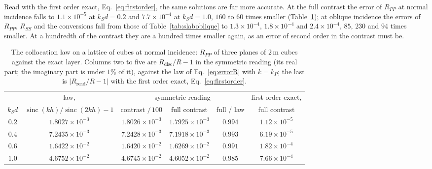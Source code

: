 \documentclass[11pt,a4paper]{article}
\newcommand{\sinc}{\operatorname{sinc}}
\begin{document}
Read with the first order exact, Eq.~\eqref{eq:firstorder}, the same solutions are far more accurate. At
the full contrast the error of $R_{PP}$ at normal incidence falls to $1.1\times10^{-5}$ at $k_Sd=0.2$ and
$7.7\times10^{-4}$ at $k_Sd=1.0$, $160$ to $60$ times smaller (Table~\ref{tab:slablaw}); at oblique
incidence the errors of $R_{PP}$, $R_{SS}$ and the conversions fall from those of
Table~\ref{tab:slaboblique} to $1.3\times10^{-4}$, $1.8\times10^{-4}$ and $2.4\times10^{-4}$, $85$, $230$
and $94$ times smaller. At a hundredth of the contrast they are a hundred times smaller again, as an error
of second order in the contrast must be.

\begin{table}[htbp]
\centering
\caption{The collocation law on a lattice of cubes at normal incidence: $R_{PP}$ of three planes of
$2$\,m cubes against the exact layer. Columns two to five are $R_{\text{disc}}/R-1$ in the symmetric
reading (its real part; the imaginary part is under $1\%$ of it), against the law of
Eq.~\eqref{eq:errorR} with $k=k_P$; the last is $\lvert R_{\text{read}}/R-1\rvert$ with the first order
exact, Eq.~\eqref{eq:firstorder}.}\label{tab:slablaw}
\small\setlength{\tabcolsep}{4pt}
\begin{tabular}{@{}cccccc@{}}
\toprule
 & law, & \multicolumn{3}{c}{symmetric reading} & first order exact, \\
$k_Sd$ & $\sinc(kh)/\sinc(2kh)-1$ & contrast $/\,100$ & full contrast & full / law & full contrast \\
\midrule
$0.2$ & $1.8027\times10^{-3}$ & $1.8026\times10^{-3}$ & $1.7925\times10^{-3}$ & $0.994$ & $1.12\times10^{-5}$ \\
$0.4$ & $7.2435\times10^{-3}$ & $7.2428\times10^{-3}$ & $7.1918\times10^{-3}$ & $0.993$ & $6.19\times10^{-5}$ \\
$0.6$ & $1.6422\times10^{-2}$ & $1.6420\times10^{-2}$ & $1.6269\times10^{-2}$ & $0.991$ & $1.82\times10^{-4}$ \\
$1.0$ & $4.6752\times10^{-2}$ & $4.6745\times10^{-2}$ & $4.6052\times10^{-2}$ & $0.985$ & $7.66\times10^{-4}$ \\
\bottomrule
\end{tabular}
\end{table}
\end{document}

